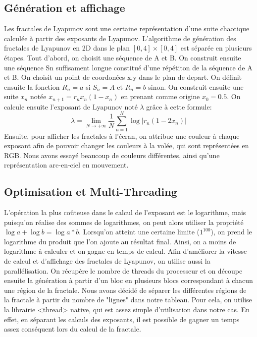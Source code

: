 \documentclass{article}
\begin{document}
	\subsection{Génération et affichage}
	Les fractales de Lyapunov sont une certaine représentation d'une suite chaotique calculée à partir des exposants de Lyapunov.
	L'algorithme de génération des fractales de Lyapunov en 2D dans le plan $[0,4] \times [0,4]$ est séparée en plusieurs étapes.
    Tout d'abord, on choisit une séquence de A et B.
	On construit ensuite une séquence Sn suffisament longue constitué d'une répétiton de la séquence de A et B.
	On choisit un point de coordonées x,y dans le plan de depart.
	On définit ensuite la fonction $R_n = a$ si $ S_n = A $ et $R_n = b$ sinon.
	On construit ensuite une suite $x_n$ notée $x_{{n+1}}=r_{n}x_{n}(1-x_{n})$ en prenant comme origine $x_0 = 0.5$.
	On calcule ensuite l'exposant de Lyapunov noté $\lambda$ grâce à cette formule:
	\[
		\lambda = \lim_{N \to +\infty} \frac{1}{N} \sum_{n=1}^{N} \log | r_n(1-2x_n) |
	\]
    Ensuite, pour afficher les fractales à l'écran, on attribue une couleur à chaque exposant afin de pouvoir changer les couleurs à la volée, qui sont représentées en RGB.
    Nous avons essayé beaucoup de couleurs différentes, ainsi qu'une représentation arc-en-ciel en mouvement.

	\subsection{Optimisation et Multi-Threading}

    L'opération la plus coûteuse dans le calcul de l'exposant est le logarithme, mais puisqu'on réalise des sommes de logarithmes, on peut alors utiliser la propriété $\log{a} + \log{b} = \log{a * b}$.
    Lorsqu'on atteint une certaine limite ($1^{100}$), on prend le logarithme du produit que l'on ajoute au résultat final.
    Ainsi, on a moins de logarithme à calculer et on gagne en temps de calcul.
	Afin d'améliorer la vitesse de calcul et d'affichage des fractales de Lyapunov, on utilise aussi la parallélisation.
    On récupère le nombre de threads du processeur et on découpe ensuite la génération à partir d'un bloc en plusieurs blocs correspondant à chacun une région de la fractale.
	Nous avons décidé de séparer les différentes régions de la fractale à partir du nombre de "lignes" dans notre tableau.
	Pour cela, on utilise la librairie <thread> native, qui est assez simple d'utilisation dans notre cas.
	En effet, en séparant les calculs des exposants, il est possible de gagner un temps assez conséquent lors du calcul de la fractale.
\end{document}
